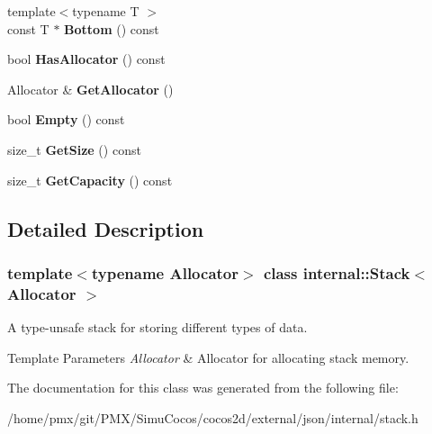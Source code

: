 \begin{DoxyCompactItemize}
\item 
\mbox{\label{classinternal_1_1Stack_af5c55983c553c7355ff6d24beb48c722}} 
{\footnotesize template$<$typename T $>$ }\\const T $\ast$ {\bfseries Bottom} () const
\item 
\mbox{\label{classinternal_1_1Stack_a657ae4d477b25d4e0045aee0efd809c3}} 
bool {\bfseries Has\+Allocator} () const
\item 
\mbox{\label{classinternal_1_1Stack_ab01f693833dfe136f574d66547623cfa}} 
Allocator \& {\bfseries Get\+Allocator} ()
\item 
\mbox{\label{classinternal_1_1Stack_a2b8bda380e33838a99e3c73ff9785f03}} 
bool {\bfseries Empty} () const
\item 
\mbox{\label{classinternal_1_1Stack_ac484468a2791bd3e9ba609bd1600ab48}} 
size\+\_\+t {\bfseries Get\+Size} () const
\item 
\mbox{\label{classinternal_1_1Stack_a67d5d7ee9424d3dd46cf9d001b6cdc6b}} 
size\+\_\+t {\bfseries Get\+Capacity} () const
\end{DoxyCompactItemize}


\subsection{Detailed Description}
\subsubsection*{template$<$typename Allocator$>$\newline
class internal\+::\+Stack$<$ Allocator $>$}

A type-\/unsafe stack for storing different types of data. 


\begin{DoxyTemplParams}{Template Parameters}
{\em Allocator} & Allocator for allocating stack memory. \\
\hline
\end{DoxyTemplParams}


The documentation for this class was generated from the following file\+:\begin{DoxyCompactItemize}
\item 
/home/pmx/git/\+P\+M\+X/\+Simu\+Cocos/cocos2d/external/json/internal/stack.\+h\end{DoxyCompactItemize}
